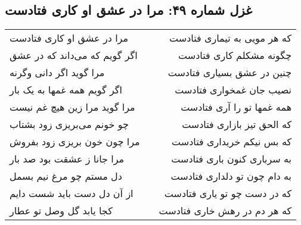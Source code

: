 \begin{center}
\section*{غزل شماره ۴۹: مرا در عشق او کاری فتادست}
\label{sec:049}
\begin{longtable}{l p{0.5cm} r}
مرا در عشق او کاری فتادست
&&
که هر مویی به تیماری فتادست
\\
اگر گویم که می‌داند که در عشق
&&
چگونه مشکلم کاری فتادست
\\
مرا گوید اگر دانی وگرنه
&&
چنین در عشق بسیاری فتادست
\\
اگر گویم همه غمها به یک بار
&&
نصیب جان غمخواری فتادست
\\
مرا گوید مرا زین هیچ غم نیست
&&
همه غمها تو را آری فتادست
\\
چو خونم می‌بریزی زود بشتاب
&&
که الحق تیز بازاری فتادست
\\
مرا چون خون بریزی زود بفروش
&&
که بس نیکم خریداری فتادست
\\
مرا جانا ز عشقت بود صد بار
&&
به سرباری کنون باری فتادست
\\
دل مستم چو مرغ نیم بسمل
&&
به دام چون تو دلداری فتادست
\\
از آن دل دست باید شست دایم
&&
که در دست چو تو یاری فتادست
\\
کجا یابد گل وصل تو عطار
&&
که هر دم در رهش خاری فتادست
\\
\end{longtable}
\end{center}
